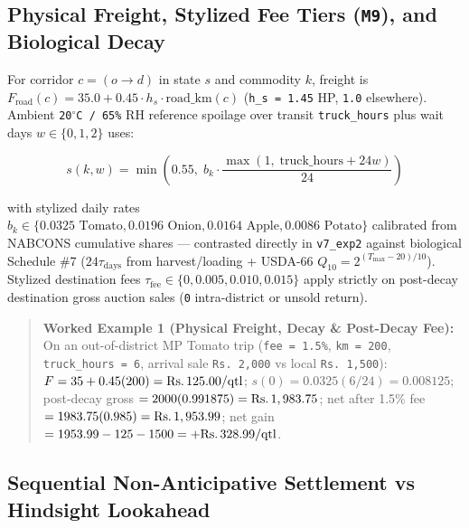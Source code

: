 \documentclass[11pt,a4paper]{article}
\begin{document}
\subsection{Physical Freight, Stylized Fee Tiers (\texttt{M9}), and Biological Decay}

For corridor $c = (o \to d)$ in state $s$ and commodity $k$, freight is $F_{\text{road}}(c) = 35.0 + 0.45 \cdot h_s \cdot \text{road\_km}(c)$ (\texttt{h\_s = 1.45} HP, \texttt{1.0} elsewhere). Ambient \texttt{20$^\circ$C / 65\%} RH reference spoilage over transit \texttt{truck\_hours} plus wait days $w \in \{0, 1, 2\}$ \citep{kader2002postharvest,gross2016usda66} uses:

\begin{equation}
s(k, w) = \min\!\left(0.55,\; b_k \cdot \frac{\max(1,\; \text{truck\_hours} + 24 w)}{24}\right)
\end{equation}

with stylized daily rates $b_k \in \{0.0325 \text{ Tomato}, 0.0196 \text{ Onion}, 0.0164 \text{ Apple}, 0.0086 \text{ Potato}\}$ calibrated from NABCONS cumulative shares \citep{nabcons2022phl} --- contrasted directly in \texttt{v7\_exp2} against biological Schedule \#7 ($24\tau_{\text{days}}$ from harvest/loading + USDA-66 $Q_{10} = 2^{(T_{\max}-20)/10}$). Stylized destination fees $\tau_{\text{fee}} \in \{0, 0.005, 0.010, 0.015\}$ apply strictly on post-decay destination gross auction sales (\texttt{0} intra-district or unsold return).

\begin{quote}
\textbf{Worked Example 1 (Physical Freight, Decay \& Post-Decay Fee):} On an out-of-district MP Tomato trip (\texttt{fee = 1.5\%}, \texttt{km = 200}, \texttt{truck\_hours = 6}, arrival sale \texttt{Rs.\,2,000} vs local \texttt{Rs.\,1,500}): $F = 35 + 0.45(200) = \text{Rs.\,}125.00/\text{qtl}$; $s(0) = 0.0325(6/24) = 0.008125$; post-decay gross $= 2000(0.991875) = \text{Rs.\,}1,983.75$; net after 1.5\% fee $= 1983.75(0.985) = \text{Rs.\,}1,953.99$; net gain $= 1953.99 - 125 - 1500 = +\text{Rs.\,}328.99/\text{qtl}$.

\end{quote}

\subsection{Sequential Non-Anticipative Settlement vs Hindsight Lookahead}
\end{document}

